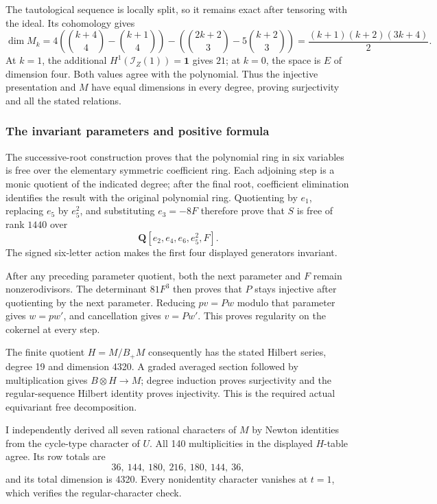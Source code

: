 \documentclass[
  10pt,
]{article}
\begin{document}
The tautological sequence is locally split, so it remains exact after
tensoring with the ideal. Its cohomology gives \[
\dim M_k=4\left(\binom{k+4}{4}-\binom{k+1}{4}\right)
-\left(\binom{2k+2}{3}-5\binom{k+2}{3}\right)
=\frac{(k+1)(k+2)(3k+4)}2.
\] At \(k=1\), the additional \(H^1(\mathcal I_Z(1))=\mathbf1\) gives
\(21\); at \(k=0\), the space is \(E\) of dimension four. Both values
agree with the polynomial. Thus the injective presentation and \(M\)
have equal dimensions in every degree, proving surjectivity and all the
stated relations.

\subsubsection{The invariant parameters and positive
formula}\label{the-invariant-parameters-and-positive-formula}

The successive-root construction proves that the polynomial ring in six
variables is free over the elementary symmetric coefficient ring. Each
adjoining step is a monic quotient of the indicated degree; after the
final root, coefficient elimination identifies the result with the
original polynomial ring. Quotienting by \(e_1\), replacing \(e_5\) by
\(e_5^2\), and substituting \(e_3=-8F\) therefore prove that \(S\) is
free of rank \(1440\) over \[
\mathbf Q[e_2,e_4,e_6,e_5^2,F].
\] The signed six-letter action makes the first four displayed
generators invariant.

After any preceding parameter quotient, both the next parameter and
\(F\) remain nonzerodivisors. The determinant \(81F^3\) then proves that
\(P\) stays injective after quotienting by the next parameter. Reducing
\(pv=Pw\) modulo that parameter gives \(w=pw'\), and cancellation gives
\(v=Pw'\). This proves regularity on the cokernel at every step.

The finite quotient \(H=M/B_+M\) consequently has the stated Hilbert
series, degree 19 and dimension 4320. A graded averaged section followed
by multiplication gives \(B\otimes H\to M\); degree induction proves
surjectivity and the regular-sequence Hilbert identity proves
injectivity. This is the required actual equivariant free decomposition.

I independently derived all seven rational characters of \(M\) by Newton
identities from the cycle-type character of \(U\). All 140
multiplicities in the displayed \(H\)-table agree. Its row totals are \[
36,\ 144,\ 180,\ 216,\ 180,\ 144,\ 36,
\] and its total dimension is 4320. Every nonidentity character vanishes
at \(t=1\), which verifies the regular-character check.
\end{document}
